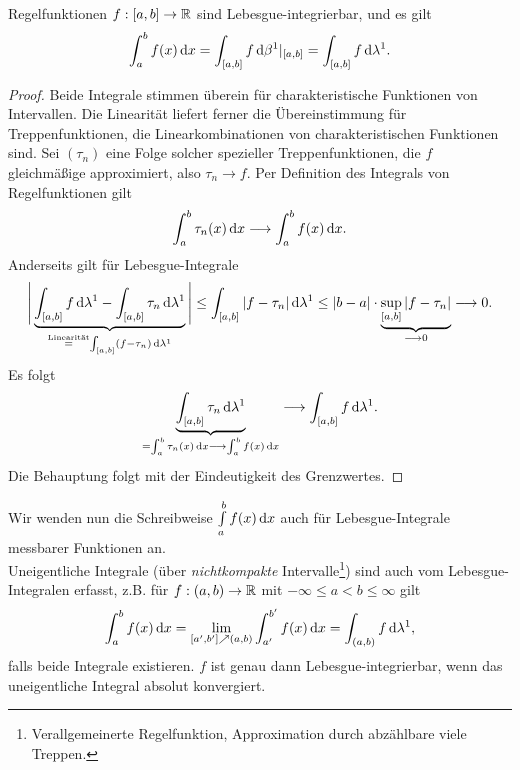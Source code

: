 \begin{proposition}
\begin{mdframed}
Regelfunktionen $f:[a,b]\to\mathbb{R}$ sind Lebesgue-integrierbar, und es gilt
$$\int_a^b f(x)\, \mathrm{d} x = \int_{[a,b]}f\, \mathrm{d}\beta^1|_{[a,b]}=\int_{[a,b]}f\, \mathrm{d}\lambda^1.$$
\end{mdframed}
\begin{proof}
Beide Integrale stimmen überein für charakteristische Funktionen von Intervallen. Die Linearität liefert ferner die Übereinstimmung für Treppenfunktionen, die Linearkombinationen von charakteristischen Funktionen sind. Sei $(\tau_n)$ eine Folge solcher spezieller Treppenfunktionen, die $f$ gleichmäßige approximiert, also $\tau_n \to f$. Per Definition des Integrals von Regelfunktionen gilt
$$\int_a^b \tau_n(x)\, \mathrm{d} x\longrightarrow \int_a^b f(x)\, \mathrm{d} x.$$
Anderseits gilt für Lebesgue-Integrale
\begin{equation*}
\begin{split}
\Bigg|		
\underbrace{\int_{[a,b]} f \, \mathrm{d} \lambda^1 - \int_{[a,b]} \tau_n \, \mathrm{d} \lambda^1}_{
\overset{\text{Linearität}}=\int_{[a,b]}(f-\tau_n)\, \mathrm{d}\lambda^1
}\Bigg| \leq  \int_{[a,b]} |f-\tau_n|\, \mathrm{d}\lambda^1
\leq |b-a|\cdot  \underbrace{\sup_{[a,b]}|f-\tau_n|}_{\longrightarrow0} \longrightarrow 0.
\end{split}
\end{equation*}
Es folgt
$$\underbrace{\int_{[a,b]}\tau_n \, \mathrm{d} \lambda^1}_{\substack{=\int_a^b \tau_n (x)\, \mathrm{d} x  \longrightarrow \int_a^b f(x)\, \mathrm{d} x}} \longrightarrow \int_{[a,b]}f \, \mathrm{d} \lambda^1.$$
Die Behauptung folgt mit der Eindeutigkeit des Grenzwertes.
\end{proof}
\end{proposition}
Wir wenden nun die Schreibweise $\int\limits_a^b f(x)\, \mathrm{d} x$ auch für Lebesgue-Integrale messbarer Funktionen an.\vspace{0.3pc}\\
Uneigentliche Integrale (über \emph{nichtkompakte} Intervalle\footnote{Verallgemeinerte Regelfunktion, Approximation durch abzählbare viele Treppen.}) sind auch vom Lebesgue-Integralen erfasst, z.B. für $f:(a,b)\to \mathbb{R}$ mit $-\infty \leq a <b \leq \infty$ gilt
$$
\int_a^b f(x)\, \mathrm{d} x =\lim_{[a',b']\nearrow (a,b)} \int_{a'}^{b'} f(x)\, \mathrm{d} x = \int_{(a,b)}f \, \mathrm{d} \lambda^1,
$$
falls beide Integrale existieren. $f$ ist genau dann Lebesgue-integrierbar, wenn das uneigentliche Integral absolut konvergiert.
